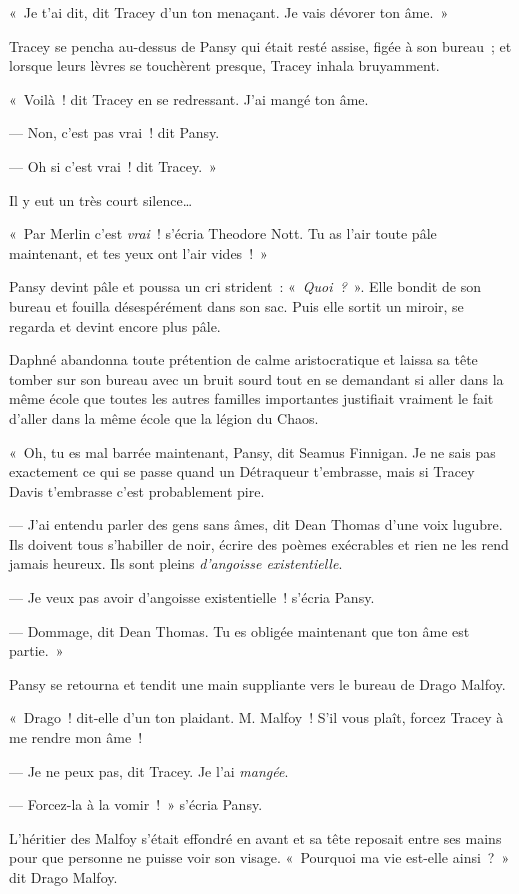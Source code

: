 «~Je t'ai dit, dit Tracey d'un ton menaçant.
Je vais dévorer ton âme.~»

Tracey se pencha au-dessus de Pansy qui était resté assise, figée à son bureau~; et lorsque leurs lèvres se touchèrent presque, Tracey inhala bruyamment.

«~Voilà~! dit Tracey en se redressant.
J'ai mangé ton âme.

--- Non, c'est pas vrai~! dit Pansy.

--- Oh si c'est vrai~! dit Tracey.~»

Il y eut un très court silence…

«~Par Merlin c'est \emph{vrai}~! s'écria Theodore Nott.
Tu as l'air toute pâle maintenant, et tes yeux ont l'air vides~!~»

Pansy devint pâle et poussa un cri strident~: «~\emph{Quoi~?}~».
Elle bondit de son bureau et fouilla désespérément dans son sac.
Puis elle sortit un miroir, se regarda et devint encore plus pâle.

Daphné abandonna toute prétention de calme aristocratique et laissa sa tête tomber sur son bureau avec un bruit sourd tout en se demandant si aller dans la même école que toutes les autres familles importantes justifiait vraiment le fait d'aller dans la même école que la légion du Chaos.

«~Oh, tu es mal barrée maintenant, Pansy, dit Seamus Finnigan.
Je ne sais pas exactement ce qui se passe quand un Détraqueur t'embrasse, mais si Tracey Davis t'embrasse c'est probablement pire.

--- J'ai entendu parler des gens sans âmes, dit Dean Thomas d'une voix lugubre.
Ils doivent tous s'habiller de noir, écrire des poèmes exécrables et rien ne les rend jamais heureux.
Ils sont pleins \emph{d'angoisse existentielle}.

--- Je veux pas avoir d'angoisse existentielle~! s'écria Pansy.

--- Dommage, dit Dean Thomas.
Tu es obligée maintenant que ton âme est partie.~»

Pansy se retourna et tendit une main suppliante vers le bureau de Drago Malfoy.

«~Drago~! dit-elle d'un ton plaidant.
M. Malfoy~!
S'il vous plaît, forcez Tracey à me rendre mon âme~!

--- Je ne peux pas, dit Tracey.
Je l'ai \emph{mangée}.

--- Forcez-la à la vomir~!~»
s'écria Pansy.

L'héritier des Malfoy s'était effondré en avant et sa tête reposait entre ses mains pour que personne ne puisse voir son visage.
«~Pourquoi ma vie est-elle ainsi~?~»
dit Drago Malfoy.


